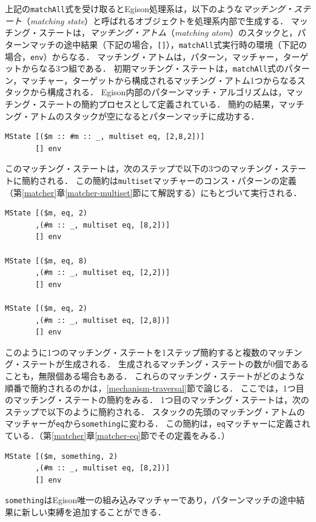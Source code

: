 上記の\lstinline{matchAll}式を受け取るとEgison処理系は，以下のような\emph{マッチング・ステート}（\emph{matching state}）と呼ばれるオブジェクトを処理系内部で生成する．
マッチング・ステートは，\emph{マッチング・アトム}（\emph{matching atom}）のスタックと，パターンマッチの途中結果（下記の場合，\lstinline{[]}），\lstinline{matchAll}式実行時の環境（下記の場合，\lstinline{env}）からなる．
マッチング・アトムは，パターン，マッチャー，ターゲットからなる3つ組である．
初期マッチング・ステートは，\lstinline{matchAll}式のパターン，マッチャー，ターゲットから構成されるマッチング・アトム1つからなるスタックから構成される．
Egison内部のパターンマッチ・アルゴリズムは，マッチング・ステートの簡約プロセスとして定義されている．
簡約の結果，マッチング・アトムのスタックが空になるとパターンマッチに成功する．
\begin{lstlisting}[language=egison,numbers=none]
MState [($m :: #m :: _, multiset eq, [2,8,2])]
       [] env
\end{lstlisting}
このマッチング・ステートは，次のステップで以下の3つのマッチング・ステートに簡約される．
この簡約は\lstinline{multiset}マッチャーのコンス・パターンの定義（第\ref{matcher}章\ref{matcher-multiset}節にて解説する）にもとづいて実行される．
\begin{lstlisting}[language=egison,numbers=none]
MState [($m, eq, 2)
       ,(#m :: _, multiset eq, [8,2])]
       [] env

MState [($m, eq, 8)
       ,(#m :: _, multiset eq, [2,2])]
       [] env

MState [($m, eq, 2)
       ,(#m :: _, multiset eq, [2,8])]
       [] env
\end{lstlisting}
このように1つのマッチング・ステートを1ステップ簡約すると複数のマッチング・ステートが生成される．
生成されるマッチング・ステートの数が0個であることも，無限個ある場合もある．
これらのマッチング・ステートがどのような順番で簡約されるのかは，\ref{mechanism-traversal}節で論じる．
ここでは，1つ目のマッチング・ステートの簡約をみる．
1つ目のマッチング・ステートは，次のステップで以下のように簡約される．
スタックの先頭のマッチング・アトムのマッチャーが\lstinline{eq}から\lstinline{something}に変わる．
この簡約は，\lstinline{eq}マッチャーに定義されている．（第\ref{matcher}章\ref{matcher-eq}節でその定義をみる．）
\begin{lstlisting}[language=egison,numbers=none]
MState [($m, something, 2)
       ,(#m :: _, multiset eq, [8,2])]
       [] env
\end{lstlisting}
\lstinline{something}はEgison唯一の組み込みマッチャーであり，パターンマッチの途中結果に新しい束縛を追加することができる．
